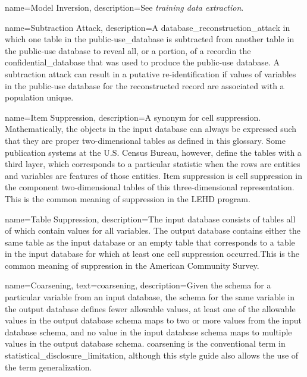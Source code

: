 {
    name=Model Inversion,
    description={See \textit{training data extraction}.}
}

{
    name=Subtraction Attack,
    description={A \gls{database_reconstruction_attack} in which one table in the \gls{public-use_database} is subtracted from another table in the public-use database to reveal all, or a portion, of a \gls{record}in the \gls{confidential_database} that was used to produce the public-use database. A subtraction attack can result in a putative re-identification if values of variables in the public-use database for the reconstructed record are associated with a population unique.}
}

{
    name=Item Suppression,
    description={A synonym for cell suppression. Mathematically, the objects in the input database can always be expressed such that they are proper two-dimensional tables as defined in this glossary. Some publication systems at the U.S. Census Bureau, however, define the tables with a third layer, which corresponds to a particular statistic when the rows are entities and variables are features of those entities. Item suppression is cell suppression in the component two-dimensional tables of this three-dimensional representation. This is the common meaning of suppression in the LEHD program.}
}

{
    name=Table Suppression,
    description={The input database consists of tables all of which contain values for all variables. The output database contains either the same table as the input database or an empty table that corresponds to a table in the input database for which at least one cell suppression occurred.This is the common meaning of suppression in the American Community Survey.}
}



{
    name=Coarsening,
    text=coarsening,
    description={Given the schema for a particular variable from an input database, the schema for the same variable in the output database defines fewer allowable values, at least one of the allowable values in the output database schema maps to two or more values from the input database schema, and no value in the input database schema maps to multiple values in the output database schema. \Gls{coarsening} is the conventional term in \gls{statistical_disclosure_limitation}, although this style guide also allows the use of the term \gls{generalization}.}
}

